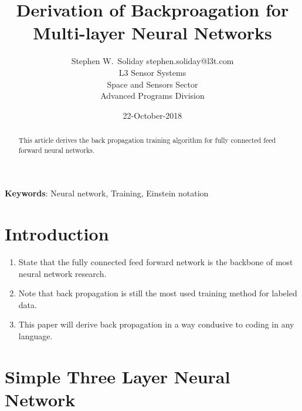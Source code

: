 \documentclass{article}
\begin{document}
\title{Derivation of Backproagation for Multi-layer Neural Networks}
\author{ \name Stephen W.~Soliday \email stephen.soliday@l3t.com \\
  \addr L3 Sensor Systems \\
  \addr Space and Sensors Sector \\
\addr Advanced Programs Division\\
}
\date{22-October-2018}

\maketitle

\begin{abstract}%

This article derives the back propagation training algorithm for fully
connected feed forward neural networks.
  
\end{abstract}

\vspace{12pt}
\textbf{Keywords}: Neural network, Training, Einstein notation

\section{Introduction\label{sec:intro}}

\begin{enumerate}
\item State that the fully connected feed forward network is the backbone of most neural
      network research.
\item Note that back propagation is still the most used training method for labeled data.
\item This paper will derive back propagation in a way condusive to coding in any language.
\end{enumerate}

\section{Simple Three Layer Neural Network\label{sec:threelayer}}
\end{document}
